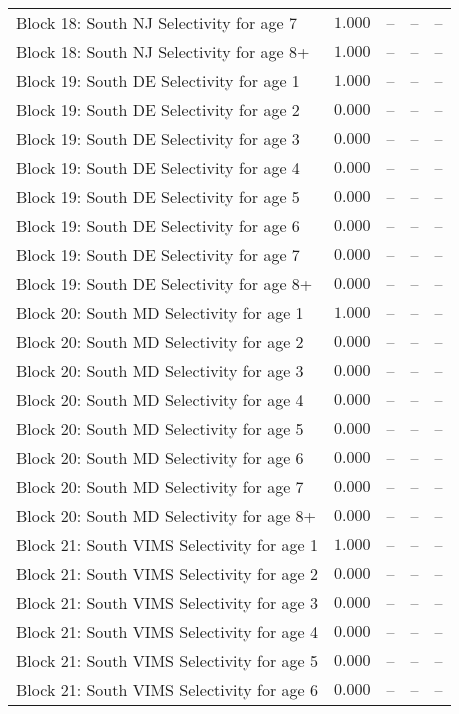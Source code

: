 \documentclass[
]{article}
\begin{document}
\begin{landscape}
\begin{longtable}[t]{lrrrr}
Block 18: South NJ Selectivity for age 7 & $1.000$ & -- & -- & --\\
\addlinespace
Block 18: South NJ Selectivity for age 8+ & $1.000$ & -- & -- & --\\
Block 19: South DE Selectivity for age 1 & $1.000$ & -- & -- & --\\
Block 19: South DE Selectivity for age 2 & $0.000$ & -- & -- & --\\
Block 19: South DE Selectivity for age 3 & $0.000$ & -- & -- & --\\
Block 19: South DE Selectivity for age 4 & $0.000$ & -- & -- & --\\
\addlinespace
Block 19: South DE Selectivity for age 5 & $0.000$ & -- & -- & --\\
Block 19: South DE Selectivity for age 6 & $0.000$ & -- & -- & --\\
Block 19: South DE Selectivity for age 7 & $0.000$ & -- & -- & --\\
Block 19: South DE Selectivity for age 8+ & $0.000$ & -- & -- & --\\
Block 20: South MD Selectivity for age 1 & $1.000$ & -- & -- & --\\
\addlinespace
Block 20: South MD Selectivity for age 2 & $0.000$ & -- & -- & --\\
Block 20: South MD Selectivity for age 3 & $0.000$ & -- & -- & --\\
Block 20: South MD Selectivity for age 4 & $0.000$ & -- & -- & --\\
Block 20: South MD Selectivity for age 5 & $0.000$ & -- & -- & --\\
Block 20: South MD Selectivity for age 6 & $0.000$ & -- & -- & --\\
\addlinespace
Block 20: South MD Selectivity for age 7 & $0.000$ & -- & -- & --\\
Block 20: South MD Selectivity for age 8+ & $0.000$ & -- & -- & --\\
Block 21: South VIMS Selectivity for age 1 & $1.000$ & -- & -- & --\\
Block 21: South VIMS Selectivity for age 2 & $0.000$ & -- & -- & --\\
Block 21: South VIMS Selectivity for age 3 & $0.000$ & -- & -- & --\\
\addlinespace
Block 21: South VIMS Selectivity for age 4 & $0.000$ & -- & -- & --\\
Block 21: South VIMS Selectivity for age 5 & $0.000$ & -- & -- & --\\
Block 21: South VIMS Selectivity for age 6 & $0.000$ & -- & -- & --\\

\end{longtable}
\end{landscape}
\end{document}
